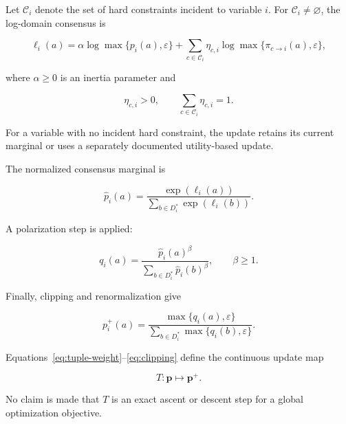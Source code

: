\documentclass[pdflatex,sn-mathphys-num,iicol,oneside]{sn-jnl}
\begin{document}
Let $\mathcal{C}_i$ denote the set of hard constraints incident to
variable $i$. For $\mathcal{C}_i\neq\varnothing$, the log-domain
consensus is

\begin{equation}
\ell_i(a)
=
\alpha
\log\max\{p_i(a),\varepsilon\}
+
\sum_{c\in\mathcal{C}_i}
\eta_{c,i}
\log\max\{
\pi_{c\rightarrow i}(a),\varepsilon
\},
\label{eq:consensus}
\end{equation}

where $\alpha\geq 0$ is an inertia parameter and

\begin{equation}
\eta_{c,i}>0,
\qquad
\sum_{c\in\mathcal{C}_i}\eta_{c,i}=1.
\end{equation}

For a variable with no incident hard constraint, the update retains
its current marginal or uses a separately documented utility-based
update.

The normalized consensus marginal is

\begin{equation}
\widehat{p}_i(a)
=
\frac{\exp(\ell_i(a))}
{\displaystyle
\sum_{b\in D_i^{*}}
\exp(\ell_i(b))}.
\end{equation}

A polarization step is applied:

\begin{equation}
q_i(a)
=
\frac{
\widehat{p}_i(a)^{\beta}
}{
\displaystyle
\sum_{b\in D_i^{*}}
\widehat{p}_i(b)^{\beta}
},
\qquad
\beta\geq 1.
\label{eq:polarization}
\end{equation}

Finally, clipping and renormalization give

\begin{equation}
p_i^{+}(a)
=
\frac{
\max\{q_i(a),\varepsilon\}
}{
\displaystyle
\sum_{b\in D_i^{*}}
\max\{q_i(b),\varepsilon\}
}.
\label{eq:clipping}
\end{equation}

Equations~\eqref{eq:tuple-weight}--\eqref{eq:clipping} define the
continuous update map

\begin{equation}
T:\bm{p}\mapsto\bm{p}^{+}.
\end{equation}

No claim is made that $T$ is an exact ascent or descent step for a
global optimization objective.
\end{document}
